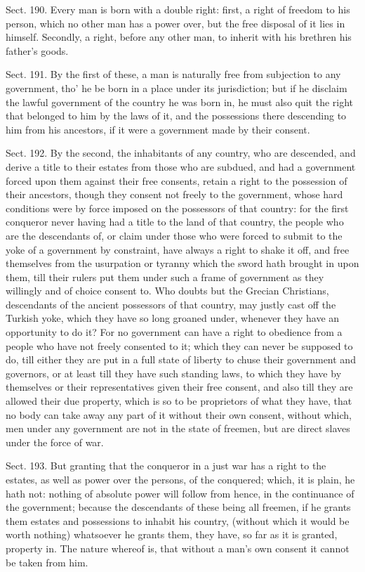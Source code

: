 \documentclass[11pt,openany]{book}
\begin{document}
Sect. 190. Every man is born with a double right: first, a right of freedom to his person, which no other man has a power over, but the free disposal of it lies in himself. Secondly, a right, before any other man, to inherit with his brethren his father's goods.

Sect. 191. By the first of these, a man is naturally free from subjection to any government, tho' he be born in a place under its jurisdiction; but if he disclaim the lawful government of the country he was born in, he must also quit the right that belonged to him by the laws of it, and the possessions there descending to him from his ancestors, if it were a government made by their consent.

Sect. 192. By the second, the inhabitants of any country, who are descended, and derive a title to their estates from those who are subdued, and had a government forced upon them against their free consents, retain a right to the possession of their ancestors, though they consent not freely to the government, whose hard conditions were by force imposed on the possessors of that country: for the first conqueror never having had a title to the land of that country, the people who are the descendants of, or claim under those who were forced to submit to the yoke of a government by constraint, have always a right to shake it off, and free themselves from the usurpation or tyranny which the sword hath brought in upon them, till their rulers put them under such a frame of government as they willingly and of choice consent to. Who doubts but the Grecian Christians, descendants of the ancient possessors of that country, may justly cast off the Turkish yoke, which they have so long groaned under, whenever they have an opportunity to do it? For no government can have a right to obedience from a people who have not freely consented to it; which they can never be supposed to do, till either they are put in a full state of liberty to chuse their government and governors, or at least till they have such standing laws, to which they have by themselves or their representatives given their free consent, and also till they are allowed their due property, which is so to be proprietors of what they have, that no body can take away any part of it without their own consent, without which, men under any government are not in the state of freemen, but are direct slaves under the force of war.

Sect. 193. But granting that the conqueror in a just war has a right to the estates, as well as power over the persons, of the conquered; which, it is plain, he hath not: nothing of absolute power will follow from hence, in the continuance of the government; because the descendants of these being all freemen, if he grants them estates and possessions to inhabit his country, (without which it would be worth nothing) whatsoever he grants them, they have, so far as it is granted, property in. The nature whereof is, that without a man's own consent it cannot be taken from him.
\end{document}
